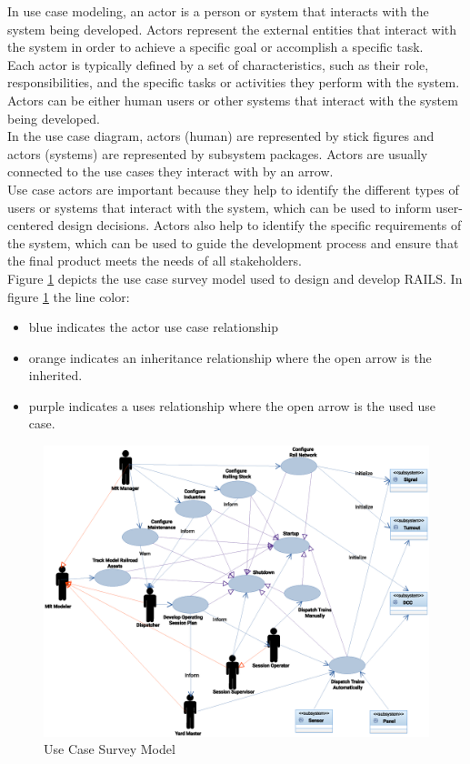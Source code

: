In use case modeling, an actor is a person or system that interacts with the system being developed. Actors represent the external entities that interact with the system in order to achieve a specific goal or accomplish a specific task.\vspace{5mm} \\
Each actor is typically defined by a set of characteristics, such as their role, responsibilities, and the specific tasks or activities they perform with the system. Actors can be either human users or other systems that interact with the system being developed.\vspace{5mm} \\
In the use case diagram, actors (human) are represented by stick figures and actors (systems) are represented by subsystem packages. Actors are usually connected to the use cases they interact with by an arrow.\vspace{5mm} \\
Use case actors are important because they help to identify the different types of users or systems that interact with the system, which can be used to inform user-centered design decisions. Actors also help to identify the specific requirements of the system, which can be used to guide the development process and ensure that the final product meets the needs of all stakeholders.\vspace{5mm} \\
Figure \ref{fig:use-case} depicts the use case survey model used to design and develop \ac{RAILS}.
In figure \ref{fig:use-case} the line color:
\begin{itemize}
  \item blue indicates the actor use case relationship
  \item orange indicates an inheritance relationship where the open arrow is the inherited.
  \item purple indicates a uses relationship where the open arrow is the used use case.
\end{itemize}
\begin{figure}
	\centering
		\includegraphics[scale=0.55]{use-case.eps}
	\caption{Use Case Survey Model}
	\label{fig:use-case}
\end{figure}
